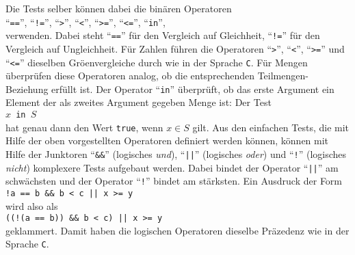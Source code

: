 Die Tests selber k\"{o}nnen dabei die bin\"{a}ren Operatoren 
\\[0.2cm]
\hspace*{1.3cm}
``\texttt{==}'',
``\texttt{!=}'',
``\texttt{>}'',
``\texttt{<}'',
``\texttt{>=}'',
``\texttt{<=}'',
``\texttt{in}'',
\\[0.2cm]
verwenden. Dabei  steht ``\texttt{==}'' f\"{u}r den Vergleich auf Gleichheit,
``\texttt{!=}'' f\"{u}r den Vergleich auf Ungleichheit.
F\"{u}r Zahlen f\"{u}hren die Operatoren ``\texttt{>}'',
``\texttt{<}'',
``\texttt{>=}'' und 
``\texttt{<=}''
dieselben Gr\"{o}\3envergleiche durch wie in der Sprache \texttt{C}.  F\"{u}r Mengen
\"{u}berpr\"{u}fen diese Operatoren analog, ob die entsprechenden Teilmengen-Beziehung
erf\"{u}llt ist.  Der Operator ``\texttt{in}'' \"{u}berpr\"{u}ft, ob das erste Argument ein
Element der als zweites Argument gegeben Menge ist: Der Test \\[0.2cm]
\hspace*{1.3cm} \texttt{$x$ in $S$} \\[0.2cm]
hat genau dann den Wert \texttt{true}, wenn $x \in S$ gilt.
Aus den einfachen Tests, die mit Hilfe der oben vorgestellten Operatoren
definiert werden k\"{o}nnen, k\"{o}nnen mit Hilfe der Junktoren ``\texttt{\&\&}'' (logisches \emph{und}),
``\texttt{||}'' (logisches \emph{oder}) und ``\texttt{!}'' (logisches \emph{nicht})
komplexere Tests aufgebaut werden.  
Dabei bindet der Operator ``\texttt{||}'' am schw\"{a}chsten und der Operator ``\texttt{!}''
bindet am st\"{a}rksten.  Ein Ausdruck der Form
\\[0.2cm]
\hspace*{1.3cm}
\texttt{!a == b \&\& b < c || x >= y}
\\[0.2cm]
wird also als
\\[0.2cm]
\hspace*{1.3cm}
\texttt{((!(a == b)) \&\& b < c) || x >= y}
\\[0.2cm]
geklammert.  Damit haben die logischen Operatoren dieselbe Pr\"{a}zedenz wie in der Sprache \texttt{C}.

